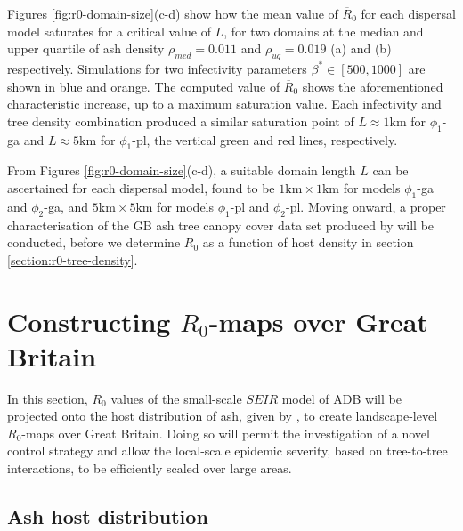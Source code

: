Figures \ref{fig:r0-domain-size}(c-d) show how the mean value of $\overline{R}_0$ for each dispersal model saturates for a critical value of $L$, 
for two domains at the median and upper quartile of ash density $\rho_{med}=0.011$ and $\rho_{uq}=0.019$ (a) and (b) respectively.
Simulations for two infectivity parameters $\beta^* \in [500, 1000]$ are shown in blue and orange.
The computed value of $\overline{R}_0$ shows the aforementioned characteristic increase, up to a maximum saturation value.
Each infectivity and tree density combination produced a similar saturation point of $L \approx 1\mathrm{km}$ for $\phi_1$-ga and $L\approx 5\mathrm{km}$ for $\phi_1$-pl, the vertical green and red lines, respectively. 

From Figures \ref{fig:r0-domain-size}(c-d), a suitable domain length $L$ can be ascertained for each dispersal model, 
found to be $\mathrm{1km\times1km}$ for models $\phi_1$-ga and $\phi_2$-ga, and $\mathrm{5km\times5km}$ for models $\phi_1$-pl and $\phi_2$-pl. 
Moving onward, a proper characterisation of the GB ash tree canopy cover data set produced by \cite{hill.data} will be conducted,
before we determine $R_0$ as a function of host density in section \ref{section:r0-tree-density}.

\section{Constructing $R_0$-maps over Great Britain}

\label{sec:r0-map-construct}
In this section, $R_0$ values of the small-scale $SEIR$ model of ADB will be projected onto the host distribution of ash, given by \cite{hill.data}, to create landscape-level $R_0$-maps over Great Britain. 
Doing so will permit the investigation of a novel control strategy and allow the local-scale epidemic severity, based on tree-to-tree interactions, to be efficiently scaled over large areas.

\subsection{Ash host distribution}

